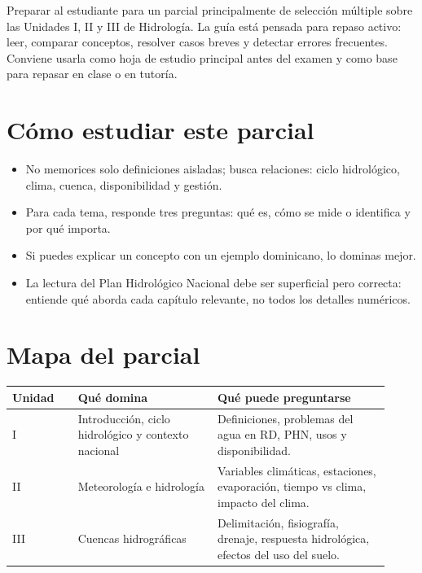 \documentclass[11pt]{article}
\begin{document}

\handoutintro
{Preparar al estudiante para un parcial principalmente de selección múltiple sobre las Unidades I, II y III de Hidrología. La guía está pensada para repaso activo: leer, comparar conceptos, resolver casos breves y detectar errores frecuentes.}
{Conviene usarla como hoja de estudio principal antes del examen y como base para repasar en clase o en tutoría.}

\section{Cómo estudiar este parcial}
\begin{itemize}
\item No memorices solo definiciones aisladas; busca relaciones: ciclo hidrológico, clima, cuenca, disponibilidad y gestión.
\item Para cada tema, responde tres preguntas: qué es, cómo se mide o identifica y por qué importa.
\item Si puedes explicar un concepto con un ejemplo dominicano, lo dominas mejor.
\item La lectura del Plan Hidrológico Nacional debe ser superficial pero correcta: entiende qué aborda cada capítulo relevante, no todos los detalles numéricos.
\end{itemize}

\section{Mapa del parcial}
\begin{center}
\begin{tabular}{p{0.16\linewidth} p{0.34\linewidth} p{0.42\linewidth}}
\toprule
\textbf{Unidad} & \textbf{Qué domina} & \textbf{Qué puede preguntarse} \\
\midrule
I & Introducción, ciclo hidrológico y contexto nacional & Definiciones, problemas del agua en RD, PHN, usos y disponibilidad. \\
II & Meteorología e hidrología & Variables climáticas, estaciones, evaporación, tiempo vs clima, impacto del clima. \\
III & Cuencas hidrográficas & Delimitación, fisiografía, drenaje, respuesta hidrológica, efectos del uso del suelo. \\
\bottomrule
\end{tabular}
\end{center}
\end{document}
